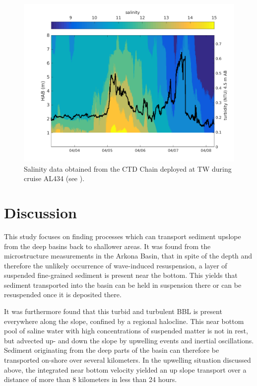  \begin{figure}[ht]
\includegraphics[width=15cm]{bilder/ctdchaintw.png}
 \caption{Salinity data obtained from the CTD Chain deployed at TW 
during cruise AL434 (see ).}
 \label{ctdchain}
 \end{figure}

\FloatBarrier
\section{Discussion}

This study focuses on finding processes which can transport sediment upslope 
from the deep basins back to shallower areas. It was found from the 
microstructure measurements in the Arkona Basin, that in spite of the depth and 
therefore the unlikely occurrence of wave-induced resuspension, a layer of 
suspended fine-grained sediment is present near the bottom. This 
yields that sediment transported into the basin can be held in suspension there 
or can be resuspended once it is deposited there.

It was furthermore found that this turbid and turbulent BBL is present 
everywhere 
along the slope, confined by a regional halocline. This near bottom pool of 
saline water with high concentrations of suspended matter is not in rest, but 
advected up- and down the slope by upwelling events and inertial oscillations. 
Sediment originating from the deep parts of the basin can therefore be 
transported on-shore over several kilometers. In the upwelling situation 
discussed above, the integrated near bottom velocity yielded an up slope 
transport over a distance of more than 8 kilometers in less than 24 hours. 


